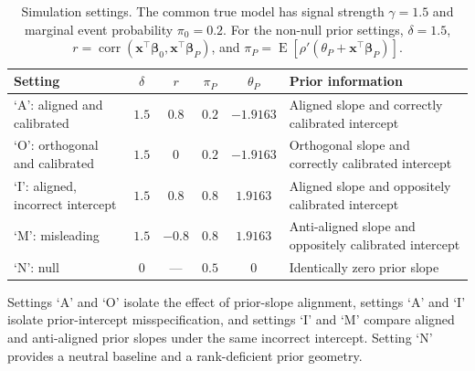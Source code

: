 \documentclass{article}
\DeclareMathOperator{\expect}{E}
\theoremstyle{definition}
\newcommand*{\bb}{\boldsymbol}
\def\bx{\bb{x}}
\def\bbeta{\bb{\beta}}
\begin{document}
\begin{bibunit}
\begin{table}[t]
\centering
\caption{Simulation settings.
The common true model has signal strength $\gamma=1.5$ and marginal event
probability $\pi_0=0.2$.
For the non-null prior settings, $\delta=1.5$,
$r=\operatorname{corr}(\bx^\top\bbeta_0,\bx^\top\bbeta_P)$, and
$\pi_P=\expect[\rho'(\theta_P+\bx^\top\bbeta_P)]$.}
\label{tab:simul-setups}
\small
\setlength{\tabcolsep}{3pt}
\begin{tabularx}{\textwidth}{
    @{}
    >{\raggedright\arraybackslash}p{}
    c
    c
    c
    c
    >{\raggedright\arraybackslash}X
    @{}
}
\toprule
Setting
&
$\delta$
&
$r$
&
$\pi_P$
&
$\theta_P$
&
Prior information
\\
\midrule
`$\mathrm{A}$': aligned and calibrated
&
$1.5$
&
$0.8$
&
$0.2$
&
$-1.9163$
&
Aligned slope and correctly calibrated intercept
\\
`$\mathrm{O}$': orthogonal and calibrated
&
$1.5$
&
$0$
&
$0.2$
&
$-1.9163$
&
Orthogonal slope and correctly calibrated intercept
\\
`$\mathrm{I}$': aligned, incorrect intercept
&
$1.5$
&
$0.8$
&
$0.8$
&
$1.9163$
&
Aligned slope and oppositely calibrated intercept
\\
`$\mathrm{M}$': misleading
&
$1.5$
&
$-0.8$
&
$0.8$
&
$1.9163$
&
Anti-aligned slope and oppositely calibrated intercept
\\
`$\mathrm{N}$': null
&
$0$
&
---
&
$0.5$
&
$0$
&
Identically zero prior slope
\\
\bottomrule
\end{tabularx}
\end{table}
Settings `$\mathrm{A}$' and `$\mathrm{O}$' isolate the effect of prior-slope
alignment, settings `$\mathrm{A}$' and `$\mathrm{I}$' isolate prior-intercept
misspecification, and settings `$\mathrm{I}$' and `$\mathrm{M}$' compare aligned
and anti-aligned prior slopes under the same incorrect intercept. Setting
`$\mathrm{N}$' provides a neutral baseline and a rank-deficient prior geometry.


\end{bibunit}
\end{document}
